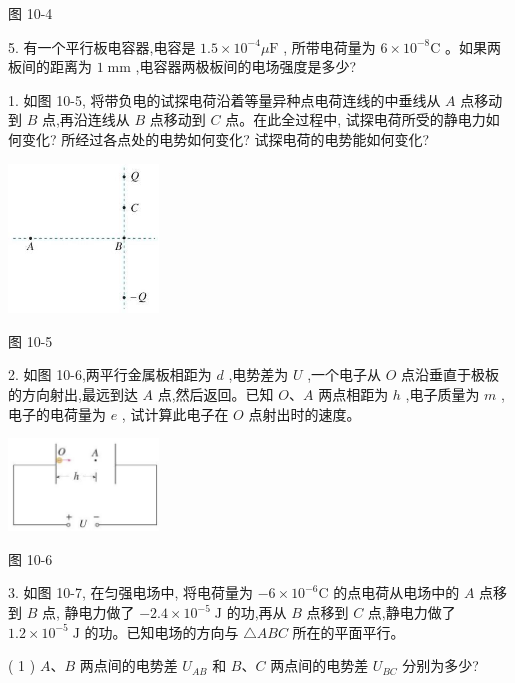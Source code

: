 \documentclass[10pt]{article}
\begin{document}
图 10-4

5. 有一个平行板电容器,电容是 \({1.5} \times {10}^{-4}\mu \mathrm{F}\) , 所带电荷量为 \(6 \times {10}^{-8}\mathrm{C}\) 。如果两板间的距离为 \(1\mathrm{\;{mm}}\) ,电容器两极板间的电场强度是多少?

1. 如图 10-5, 将带负电的试探电荷沿着等量异种点电荷连线的中垂线从 \(A\) 点移动到 \(B\) 点,再沿连线从 \(B\) 点移动到 \(C\) 点。在此全过程中, 试探电荷所受的静电力如何变化? 所经过各点处的电势如何变化? 试探电荷的电势能如何变化?

\begin{center}
\includegraphics[max width=0.3\textwidth]{images/01911d5f-8e38-70c0-b5b8-2b399bd115b6_56_317356.jpg}
\end{center}

图 10-5

2. 如图 10-6,两平行金属板相距为 \(d\) ,电势差为 \(U\) ,一个电子从 \(O\) 点沿垂直于极板的方向射出,最远到达 \(A\) 点,然后返回。已知 \(O\text{、}A\) 两点相距为 \(h\) ,电子质量为 \(m\) ,电子的电荷量为 \(e\) , 试计算此电子在 \(O\) 点射出时的速度。

\begin{center}
\includegraphics[max width=0.3\textwidth]{images/01911d5f-8e38-70c0-b5b8-2b399bd115b6_56_257869.jpg}
\end{center}

图 10-6

3. 如图 10-7, 在匀强电场中, 将电荷量为 \(- 6 \times {10}^{-6}\mathrm{C}\) 的点电荷从电场中的 \(A\) 点移到 \(B\) 点, 静电力做了 \(- {2.4} \times {10}^{-5}\mathrm{\;J}\) 的功,再从 \(B\) 点移到 \(C\) 点,静电力做了 \({1.2} \times {10}^{-5}\mathrm{\;J}\) 的功。已知电场的方向与 \(\bigtriangleup {ABC}\) 所在的平面平行。

( 1 ) \(A\text{、}B\) 两点间的电势差 \({U}_{AB}\) 和 \(B\text{、}C\) 两点间的电势差 \({U}_{BC}\) 分别为多少?
\end{document}
